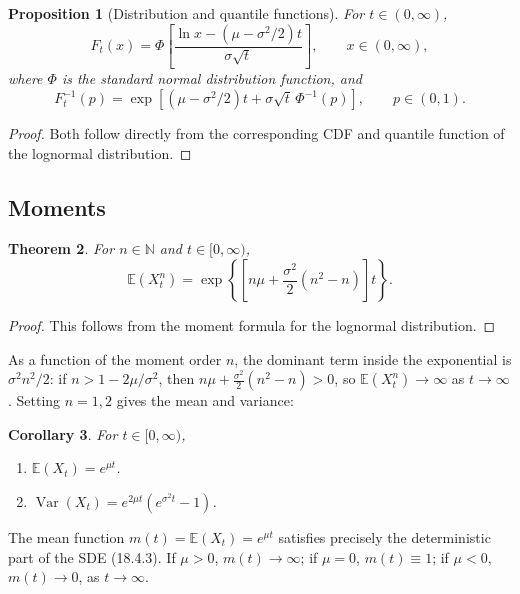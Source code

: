 \documentclass[12pt,openany]{book}
\newtheorem{theorem}{Theorem}[section]
\newtheorem{proposition}[theorem]{Proposition}
\newtheorem{corollary}[theorem]{Corollary}
\theoremstyle{definition}
\theoremstyle{remark}
\newcommand{\N}{\mathbb{N}}
\newcommand{\E}{\mathbb{E}}
\DeclareMathOperator{\Var}{Var}
\begin{document}
\begin{proposition}[Distribution and quantile functions]
For $t\in(0,\infty)$,
\begin{equation}
    F_t(x) = \Phi\!\left[\frac{\ln x - (\mu-\sigma^2/2)t}{\sigma\sqrt t}\right], \qquad x\in(0,\infty), \tag{18.4.5}
\end{equation}
where $\Phi$ is the standard normal distribution function, and
\begin{equation}
    F_t^{-1}(p) = \exp\!\left[(\mu-\sigma^2/2)t + \sigma\sqrt t\,\Phi^{-1}(p)\right], \qquad p\in(0,1). \tag{18.4.6}
\end{equation}
\end{proposition}
\begin{proof}
Both follow directly from the corresponding CDF and quantile function of the lognormal distribution.
\end{proof}
 
\subsection{Moments}
 
\begin{theorem}
For $n\in\N$ and $t\in[0,\infty)$,
\begin{equation}
    \E(X_t^n) = \exp\!\left\{\left[n\mu + \frac{\sigma^2}{2}(n^2-n)\right]t\right\}. \tag{18.4.7}
\end{equation}
\end{theorem}
\begin{proof}
This follows from the moment formula for the lognormal distribution.
\end{proof}
 
As a function of the moment order $n$, the dominant term inside the exponential is $\sigma^2n^2/2$: if $n>1-2\mu/\sigma^2$, then $n\mu+\tfrac{\sigma^2}2(n^2-n)>0$, so $\E(X_t^n)\to\infty$ as $t\to\infty$. Setting $n=1,2$ gives the mean and variance:
 
\begin{corollary}
For $t\in[0,\infty)$,
\begin{enumerate}[label=(\arabic*)]
    \item $\E(X_t) = e^{\mu t}$.
    \item $\Var(X_t) = e^{2\mu t}\left(e^{\sigma^2 t}-1\right)$.
\end{enumerate}
\end{corollary}
 
The mean function $m(t)=\E(X_t)=e^{\mu t}$ satisfies precisely the deterministic part of the SDE (18.4.3). If $\mu>0$, $m(t)\to\infty$; if $\mu=0$, $m(t)\equiv1$; if $\mu<0$, $m(t)\to0$, as $t\to\infty$.
 
\end{document}
